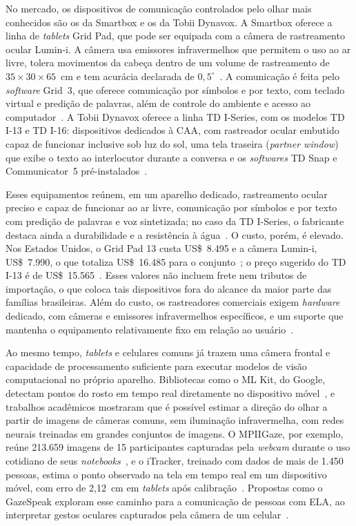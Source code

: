 No mercado, os dispositivos de comunicação controlados pelo olhar mais conhecidos são os da Smartbox e os da Tobii Dynavox. A Smartbox oferece a linha de \textit{tablets} Grid Pad, que pode ser equipada com a câmera de rastreamento ocular Lumin-i. A câmera usa emissores infravermelhos que permitem o uso ao ar livre, tolera movimentos da cabeça dentro de um volume de rastreamento de $35 \times 30 \times 65$~cm e tem acurácia declarada de $0{,}5^\circ$~\cite{smartbox_lumini}. A comunicação é feita pelo \textit{software} Grid~3, que oferece comunicação por símbolos e por texto, com teclado virtual e predição de palavras, além de controle do ambiente e acesso ao computador~\cite{grid3}. A Tobii Dynavox oferece a linha TD I-Series, com os modelos TD I-13 e TD I-16: dispositivos dedicados à \gls{CAA}, com rastreador ocular embutido capaz de funcionar inclusive sob luz do sol, uma tela traseira (\textit{partner window}) que exibe o texto ao interlocutor durante a conversa e os \textit{softwares} TD Snap e Communicator~5 pré-instalados~\cite{tobii_iseries}.

Esses equipamentos reúnem, em um aparelho dedicado, rastreamento ocular preciso e capaz de funcionar ao ar livre, comunicação por símbolos e por texto com predição de palavras e voz sintetizada; no caso da TD I-Series, o fabricante destaca ainda a durabilidade e a resistência à água~\cite{tobii_iseries}. O custo, porém, é elevado. Nos Estados Unidos, o Grid Pad 13 custa US\$~8.495 e a câmera Lumin-i, US\$~7.990, o que totaliza US\$~16.485 para o conjunto~\cite{smartbox_precos}; o preço sugerido do TD I-13 é de US\$~15.565~\cite{tobii_preco}. Esses valores não incluem frete nem tributos de importação, o que coloca tais dispositivos fora do alcance da maior parte das famílias brasileiras. Além do custo, os rastreadores comerciais exigem \textit{hardware} dedicado, com câmeras e emissores infravermelhos específicos, e um suporte que mantenha o equipamento relativamente fixo em relação ao usuário~\cite{zhang2017gazespeak}.

Ao mesmo tempo, \textit{tablets} e celulares comuns já trazem uma câmera frontal e capacidade de processamento suficiente para executar modelos de visão computacional no próprio aparelho. Bibliotecas como o ML Kit, do Google, detectam pontos do rosto em tempo real diretamente no dispositivo móvel~\cite{mlkit_facemesh}, e trabalhos acadêmicos mostraram que é possível estimar a direção do olhar a partir de imagens de câmeras comuns, sem iluminação infravermelha, com redes neurais treinadas em grandes conjuntos de imagens. O MPIIGaze, por exemplo, reúne 213.659 imagens de 15 participantes capturadas pela \textit{webcam} durante o uso cotidiano de seus \textit{notebooks}~\cite{zhang2015mpiigaze}, e o iTracker, treinado com dados de mais de 1.450 pessoas, estima o ponto observado na tela em tempo real em um dispositivo móvel, com erro de 2,12~cm em \textit{tablets} após calibração~\cite{krafka2016eye}. Propostas como o GazeSpeak exploram esse caminho para a comunicação de pessoas com \gls{ELA}, ao interpretar gestos oculares capturados pela câmera de um celular~\cite{zhang2017gazespeak}.

